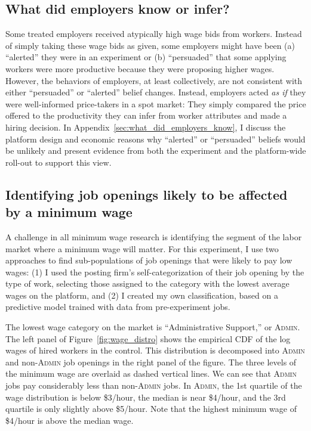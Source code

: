\documentclass[AER]{AEA}
\newcommand{\admin}{\textsc{Admin}}
\begin{document}
\subsection{What did employers know or infer?} \label{sec:employer_knowledge}


Some treated employers received atypically high wage bids from workers.
Instead of simply taking these wage bids as given, some employers might have been (a) ``alerted'' they were in an experiment or (b) ``persuaded'' that some applying workers were more productive because they were proposing higher wages.
However, the behaviors of employers, at least collectively, are not consistent with either ``persuaded'' or ``alerted'' belief changes.
Instead, employers acted \emph{as if} they were well-informed price-takers in a spot market:
They simply compared the price offered to the productivity they can infer from worker attributes and made a hiring decision. 
In Appendix~\ref{sec:what_did_employers_know}, I discuss the platform design and economic reasons why ``alerted'' or ``persuaded'' beliefs would be unlikely and present evidence from both the experiment and the platform-wide roll-out to support this view.

\subsection{Identifying job openings likely to be affected by a minimum wage \label{sec:def}}

A challenge in all minimum wage research is identifying the segment of the labor market where a minimum wage will matter.
For this experiment, I use two approaches to find sub-populations of job openings that were likely to pay low wages: 
(1) I used the posting firm's self-categorization of their job opening by the type of work, selecting those assigned to the category with the lowest average wages on the platform, and (2) I created my own classification, based on a predictive model trained with data from pre-experiment jobs.

The lowest wage category on the market is ``Administrative Support,'' or \admin{}. 
The left panel of Figure~\ref{fig:wage_distro} shows the empirical CDF of the log wages of hired workers in the control.
This distribution is decomposed into \admin{} and non-\admin{} job openings in the right panel of the figure.
The three levels of the minimum wage are overlaid as dashed vertical lines.
We can see that \admin{} jobs pay considerably less than non-\admin{} jobs. 
In \admin{}, the 1st quartile of the wage distribution is below \$3/hour, the median is near \$4/hour, and the 3rd quartile is only slightly above \$5/hour.
Note that the highest minimum wage of \$4/hour is above the median wage.
\end{document}
